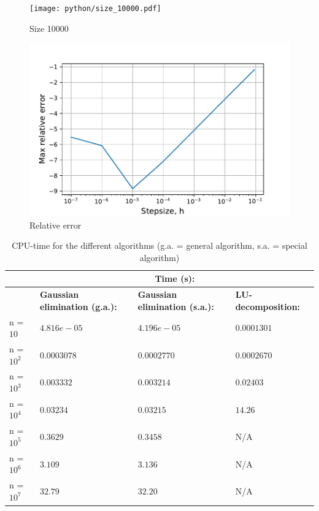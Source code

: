 \documentclass{article}
\begin{document}
\begin{figure}[h]
    \centering
    \texttt{[image: python/size\_10000.pdf]}
    \caption{Size 10000}
    \label{fig:4}
\end{figure}

\begin{figure}[h]
    \centering
    \includegraphics[width =12cm]{python/relative_error.pdf}
    \caption{Relative error}
    \label{fig:re}
\end{figure}

\begin{table}[]
\begin{tabular}{llll}
           & \multicolumn{3}{c}{\textbf{Time (s):}}                                                                  \\ \hline
           & \textbf{Gaussian elimination (g.a.):} & \textbf{Gaussian elimination (s.a.):} & \textbf{LU-decomposition:} \\ \hline
n = $10$   & $4.816e-05$                              & $4.196e-05$                              & $0.0001301$       \\
n = $10^2$  & $0.0003078$                              & $0.0002770$                              & $0.0002670$       \\
n = $10^3$ & $0.003332$                               & $0.003214$                               & $0.02403$         \\
n = $10^4$ & $0.03234$                                & $0.03215$                                & $14.26$           \\
n = $10^5$ & $0.3629$                                 & $0.3458$                                 & N/A               \\
n = $10^6$ & $3.109$                                  & $3.136$                                  & N/A               \\
n = $10^7$ & $32.79$                                  & $32.20$                                  & N/A              
\end{tabular}
\label{tab:1}
\caption{CPU-time for the different algorithms (g.a. = general algorithm, s.a. = special algorithm)}
\end{table}
\end{document}

